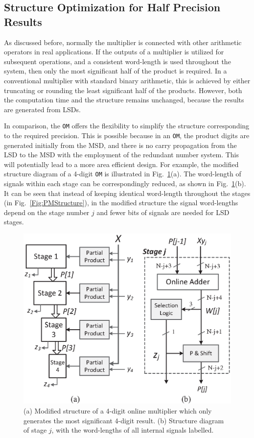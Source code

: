 \documentclass[conference]{IEEEtran}
\begin{document}
\subsection{Structure Optimization for Half Precision Results}\vspace{-0.5ex}
As discussed before, normally the multiplier is connected with other arithmetic operators in real applications. If the outputs of a multiplier is utilized for subsequent operations, and a consistent word-length is used throughout the system, then only the most significant half of the product is required. In a conventional multiplier with standard binary arithmetic, this is achieved by either truncating or rounding the least significant half of the products. However, both the computation time and the structure remains unchanged, because the results are generated from LSDs.\vspace{-0.5ex}

In comparison, the \texttt{OM} offers the flexibility to simplify the structure corresponding to the required precision. This is possible because in an \texttt{OM}, the product digits are generated initially from the MSD, and there is no carry propagation from the LSD to the MSD with the employment of the redundant number system. This will potentially lead to a more area efficient design. For example, the modified structure diagram of a 4-digit \texttt{OM} is illustrated in Fig.~\ref{Fig:PMStructure_MSDhalf}(a). The word-length of signals within each stage can be correspondingly reduced, as shown in Fig.~\ref{Fig:PMStructure_MSDhalf}(b). It can be seen that instead of keeping identical word-length throughout the stages (in Fig.~\ref{Fig:PMStructure}), in the modified structure the signal word-lengths depend on the stage number $j$ and fewer bits of signals are needed for LSD stages.\vspace{-3ex}
%
\begin{figure}[tbp]
	\centering
	\includegraphics[width=.45\textwidth]{./Figures/ParallelMult_MSDhalf.eps}
  \vspace{-1ex}
	\caption{(a) Modified structure of a 4-digit online multiplier which only generates the most significant 4-digit result. (b) Structure diagram of stage $j$, with the word-lengths of all internal signals labelled.}
	\label{Fig:PMStructure_MSDhalf}
	\vspace{-2ex}
\end{figure}
\end{document}
